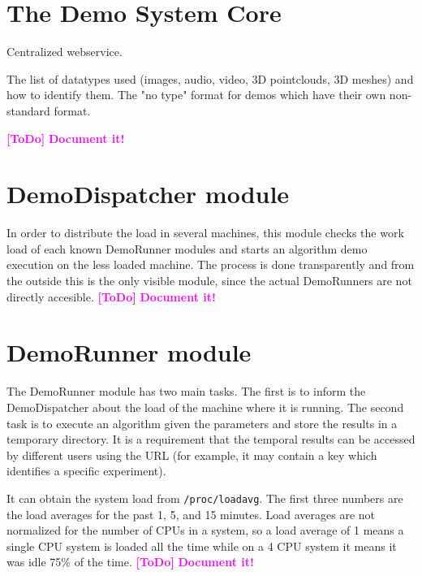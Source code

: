 \documentclass[a4paper,12pt]{article}
\newcommand{\ToDo}[1]{\textcolor{magenta}{\textbf{[ToDo]} \textbf{#1}}}
\begin{document}
\section{The Demo System Core}
Centralized webservice.

The list of datatypes used (images, audio, video, 3D pointclouds, 3D meshes) and how to identify them. The "no type" format for demos which have their own non-standard format.

\ToDo{Document it!}











\section{DemoDispatcher module}
In order to distribute the load in several machines, this module checks the work load of each known DemoRunner modules and starts an algorithm demo execution on the less loaded machine. The process is done transparently and from the outside this is the only visible module, since the actual DemoRunners are not directly accesible.
\ToDo{Document it!}

\section{DemoRunner module}
The DemoRunner module has two main tasks. The first is to inform the DemoDispatcher about the load of the machine where it is running. The second task is to execute an algorithm given the parameters and store the results in a temporary directory. It is a requirement that the temporal results can be accessed by different users using the URL (for example, it may contain a key which identifies a specific experiment).

It can obtain the system load from {\tt /proc/loadavg}. The first three numbers are the load averages for the past 1, 5, and 15 minutes. Load averages are not normalized for the number of CPUs in a system, so a load  average  of 1 means a single CPU system is loaded all the time while on a 4 CPU system it means it was idle 75\% of the time.
\ToDo{Document it!}
\end{document}
